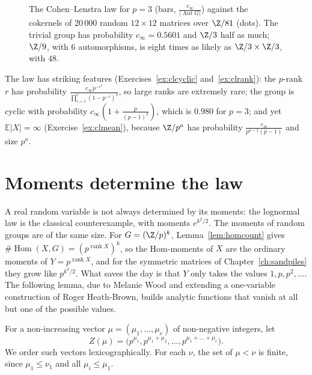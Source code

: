 \begin{figure}[ht]
\centering{}
\caption{The Cohen--Lenstra law for $p=3$ (bars, $\frac{c_\infty}{|\operatorname{Aut}G|}$) against the cokernels of $20\,000$ random $12\times12$ matrices over $\Z/81$ (dots). The trivial group has probability $c_\infty=0.5601$ and $\Z/3$ half as much; $\Z/9$, with $6$ automorphisms, is eight times as likely as $\Z/3\times\Z/3$, with $48$.}
\label{fig:cokernels}
\end{figure}

The law has striking features (Exercises~\ref{ex:clcyclic} and~\ref{ex:clrank}): the $p$-rank $r$ has probability $\frac{c_\infty p^{-r^2}}{\prod_{i=1}^r(1-p^{-i})^2}$, so large ranks are extremely rare; the group is cyclic with probability $c_\infty(1+\frac p{(p-1)^2})$, which is $0.980$ for $p=3$; and yet $\mathbb E|X|=\infty$ (Exercise~\ref{ex:clmean}), because $\Z/p^a$ has probability $\frac{c_\infty}{p^{a-1}(p-1)}$ and size $p^a$.

\section{Moments determine the law}

A real random variable is not always determined by its moments: the lognormal law is the classical counterexample, with moments $e^{k^2/2}$. The moments of random groups are of the same size. For $G=(\Z/p)^k$, Lemma~\ref{lem:homcount} gives $\#\operatorname{Hom}(X,G)=(p^{\operatorname{rank}X})^k$, so the Hom-moments of $X$ are the ordinary moments of $Y=p^{\operatorname{rank}X}$, and for the symmetric matrices of Chapter~\ref{ch:sandpiles} they grow like $p^{k^2/2}$. What saves the day is that $Y$ only takes the values $1,p,p^2,\dots$. The following lemma, due to Melanie Wood and extending a one-variable construction of Roger Heath-Brown, builds analytic functions that vanish at all but one of the possible values.

For a non-increasing vector $\mu=(\mu_1,\dots,\mu_e)$ of non-negative integers, let\[Z(\mu)=\bigl(p^{\mu_1},p^{\mu_1+\mu_2},\dots,p^{\mu_1+\dots+\mu_e}\bigr).\] We order such vectors lexicographically. For each $\nu$, the set of $\mu<\nu$ is finite, since $\mu_1\le\nu_1$ and all $\mu_i\le\mu_1$.

